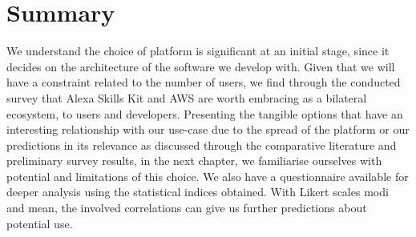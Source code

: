 	
	


%
%
%
%
%










%
%
%
%


















\section{Summary}

We understand the choice of platform is significant at an initial stage, since it decides on the architecture of the software we develop with. Given that we will have a constraint related to the number of users, we find through the conducted survey that Alexa Skills Kit and AWS are worth embracing as a bilateral ecosystem, to users and developers. Presenting the tangible options that have an interesting relationship with our use-case due to the spread of the platform or our predictions in its relevance as discussed through the comparative literature and preliminary survey results,
in the next chapter, we familiarise ourselves with potential and limitations of this choice.
We also have a questionnaire available for deeper analysis using the statistical indices obtained. With Likert scales modi and mean, the involved correlations can give us further predictions about potential use.





